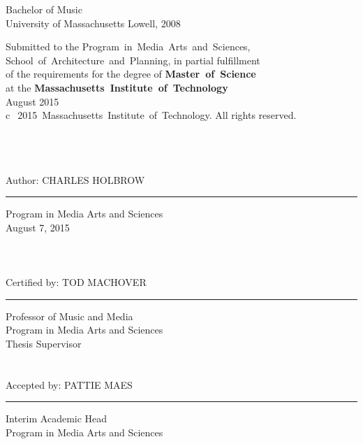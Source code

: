 
\noindent Bachelor of Music\\
\noindent University of Massachusetts Lowell, 2008\\

\vspace{30mm}

\begin{raggedright}
\noindent Submitted to the Program~in~Media~Arts~and~Sciences,\\
School~of~Architecture~and~Planning, in partial fulfillment\\
of the requirements for the degree of \textbf{Master~of~Science}\\
at the \textbf{Massachusetts~Institute~of~Technology} \\
\noindent August 2015\\
\noindent \textcircled{c}~2015~Massachusetts~Institute~of~Technology. All rights reserved. \\
\end{raggedright}

\begin{fullwidth}
\mbox{ }\\
\mbox{ }\\
\mbox{ }\\


\noindent Author: \hfill CHARLES HOLBROW\vspace{3pt}\hrule\vspace{6pt}
\flushright Program in Media Arts and Sciences\\
\flushright August 7, 2015 \\
\mbox{ }\\
\mbox{ }\\
\mbox{ }\\
 
\noindent Certified by: \hfill TOD MACHOVER\vspace{3pt}\hrule\vspace{6pt}
Professor of Music and Media\\
Program in Media Arts and Sciences\\
Thesis Supervisor\\
\mbox{ }\\ 
\mbox{ }\\

\noindent Accepted by: \hfill PATTIE MAES\vspace{3pt}\hrule\vspace{6pt}
Interim Academic Head\\
Program in Media Arts and Sciences\\

\thispagestyle{empty}  %
\end{fullwidth}
 
